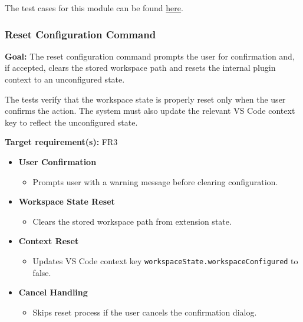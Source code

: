 \documentclass[12pt, titlepage]{article}
\begin{document}
\noindent The test cases for this module can be found
\href{https://github.com/ssm-lab/capstone--sco-vs-code-plugin/blob/plugin-multi-file/test/commands/configureWorkspace.test.ts}{here}.

\subsubsection{Reset Configuration Command}

\textbf{Goal:} The reset configuration command prompts the user for confirmation and, if accepted, clears the stored workspace path and resets the internal plugin context to an unconfigured state.

\medskip

\noindent The tests verify that the workspace state is properly reset only when the user confirms the action. The system must also update the relevant VS Code context key to reflect the unconfigured state.

\medskip

\noindent\textbf{Target requirement(s):} FR3~\cite{SRS}

\begin{itemize}
  \item \textbf{User Confirmation}
    \begin{itemize}
      \item Prompts user with a warning message before clearing configuration.
    \end{itemize}

  \item \textbf{Workspace State Reset}
    \begin{itemize}
      \item Clears the stored workspace path from extension state.
    \end{itemize}

  \item \textbf{Context Reset}
    \begin{itemize}
      \item Updates VS Code context key \texttt{workspaceState.workspaceConfigured} to false.
    \end{itemize}

  \item \textbf{Cancel Handling}
    \begin{itemize}
      \item Skips reset process if the user cancels the confirmation dialog.
    \end{itemize}
\end{itemize}
\end{document}
